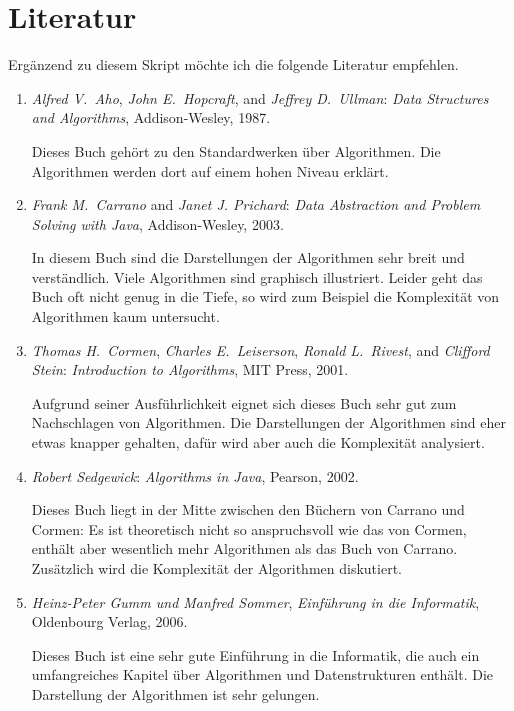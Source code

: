 \section{Literatur}
Erg\"anzend zu diesem Skript m\"ochte ich die folgende Literatur empfehlen.
\begin{enumerate}
\item \textsl{Alfred V.~Aho}, \textsl{John E.~Hopcraft}, and \textsl{Jeffrey D.~Ullman}:
      \emph{Data Structures and Algorithms}, Addison-Wesley, 1987. 
      
      Dieses Buch geh\"ort zu den Standardwerken \"uber Algorithmen.  
      Die Algorithmen werden dort auf einem hohen Niveau erkl\"art.
\item \textsl{Frank M.~Carrano} and \textsl{Janet J. Prichard}:
      \emph{Data Abstraction and Problem Solving with \textsl{Java}}, 
      Addison-Wesley, 2003. 

      In diesem Buch sind die Darstellungen der Algorithmen sehr breit und
      verst\"andlich.  Viele Algorithmen sind graphisch illustriert. 
      Leider geht das Buch oft nicht genug in die Tiefe, so wird zum Beispiel
      die Komplexit\"at von Algorithmen kaum untersucht.
\item \textsl{Thomas H.~Cormen}, \textsl{Charles E.~Leiserson}, 
      \textsl{Ronald L.~Rivest}, and \textsl{Clifford Stein}:
      \emph{Introduction to Algorithms}, 
      MIT Press, 2001. 

      Aufgrund seiner Ausf\"uhrlichkeit eignet sich dieses Buch sehr gut zum
      Nachschlagen von Algorithmen.  Die Darstellungen der Algorithmen sind eher
      etwas knapper gehalten, daf\"ur wird aber auch die Komplexit\"at analysiert.
\item \textsl{Robert Sedgewick}: \emph{Algorithms in \textsl{Java}}, 
      Pearson, 2002.
    
      Dieses Buch liegt in der Mitte zwischen den B\"uchern von Carrano und
      Cormen:  Es ist theoretisch nicht so anspruchsvoll wie das von Cormen,
      enth\"alt aber wesentlich mehr Algorithmen als das Buch von Carrano.
      Zus\"atzlich wird die Komplexit\"at der Algorithmen diskutiert.
\item \textsl{Heinz-Peter Gumm und Manfred Sommer},
      \emph{Einf\"uhrung in die Informatik},
      Oldenbourg Verlag, 2006.

      Dieses Buch ist eine sehr gute Einf\"uhrung in die Informatik, die auch ein
      umfangreiches Kapitel \"uber Algorithmen und Datenstrukturen enth\"alt.  
      Die Darstellung der Algorithmen ist sehr gelungen.
\end{enumerate}

\nocite{aho:87}
\nocite{boerger:2003}
\nocite{carrano:02}
\nocite{cormen:01}
\nocite{gurevich:91}
\nocite{sedgewick:02}

